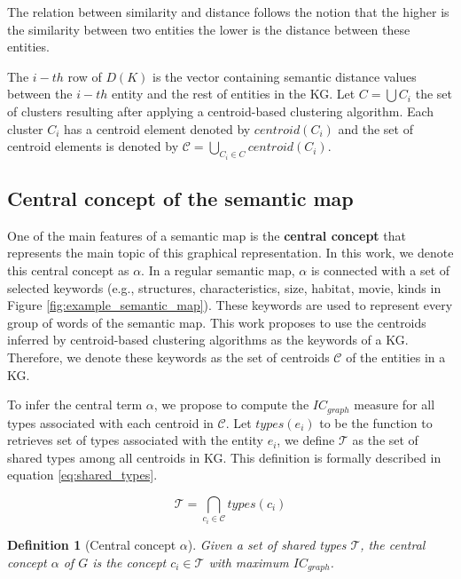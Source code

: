 \documentclass{ieeeaccess}
\newtheorem{Definition}{Definition}
\begin{document}
 The 
relation between similarity and distance follows the notion that
the higher is the similarity between two entities the lower is the
distance between these entities. 

The $i-th$ row of $D(K)$ is the vector containing semantic distance
values between the $i-th$ entity and the rest of entities in the 
KG. Let $C = \bigcup C_{i}$ the set of clusters resulting after applying 
a centroid-based clustering algorithm. Each cluster $C_{i}$ has
a centroid element denoted by $centroid(C_{i})$ and the set of centroid
elements is denoted by $\mathcal{C} = \bigcup_{C_{i} \in C} centroid(C_{i})$.

\subsection{Central concept of the semantic map}

One of the main features of a semantic map is the 
\textbf{central concept} that represents the main topic of this
graphical representation. In this work, we denote this
central concept as $\alpha$. In a regular semantic map,
$\alpha$ is connected with a set of selected keywords (e.g., 
{structures, characteristics, size, habitat, movie, kinds} in 
Figure \ref{fig:example_semantic_map}). These keywords are used 
to represent every group of words of the semantic map. This work
proposes to use the centroids inferred by centroid-based 
clustering algorithms \cite{Dongkuan2015} as the keywords 
of a KG. Therefore, we denote these keywords as the set 
of centroids $\mathcal{C}$ of the entities in a KG.

To infer the central term $\alpha$, we propose to compute the
$IC_{graph}$ measure for all types associated with each centroid
in $\mathcal{C}$. Let $types(e_{i})$ to be the function to 
retrieves set of types associated with the entity $e_{i}$, 
we define $\mathcal{T}$ as the set of shared types among 
all centroids in KG. This definition is formally described in
equation \ref{eq:shared_types}.

\begin{equation}
    \label{eq:shared_types}
    \mathcal{T} = \bigcap_{c_{i} \in \mathcal{C}} types(c_{i})
\end{equation}

\begin{Definition}[Central concept $\alpha$]
Given a set of shared types 
$\mathcal{T}$, the central concept $\alpha$ of $G$ is the concept
$c_{i} \in \mathcal{T}$ with maximum $IC_{graph}$.
\end{Definition}
\end{document}
